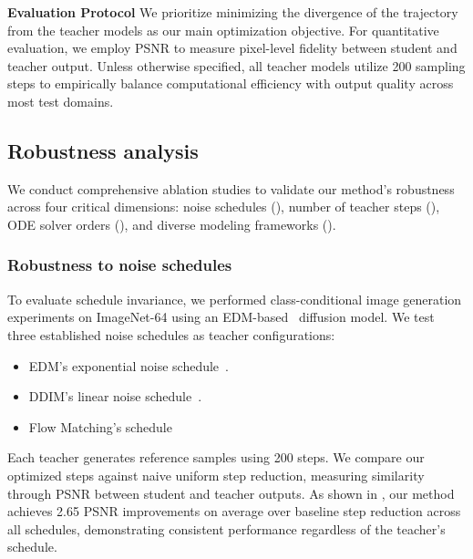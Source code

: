 \documentclass[10pt,twocolumn,letterpaper]{article}
\begin{document}
    \textbf{Evaluation Protocol}
    We prioritize minimizing the divergence of the trajectory from the teacher models as our main optimization objective. For quantitative evaluation, we employ PSNR to measure pixel-level fidelity between student and teacher output. Unless otherwise specified, all teacher models utilize 200 sampling steps to empirically balance computational efficiency with output quality across most test domains.
    
    

    \subsection{Robustness analysis}
    We conduct comprehensive ablation studies to validate our method's robustness across four critical dimensions: noise schedules (), number of teacher steps (), ODE solver orders (), and diverse modeling frameworks ().

    \subsubsection{Robustness to noise schedules} \label{sec:teacher_schedule}
    To evaluate schedule invariance, we performed class-conditional image generation experiments on ImageNet-64\cite{russakovsky2015imagenet} using an EDM-based~\cite{edm} diffusion model. We test three established noise schedules as teacher configurations: 
    \begin{itemize} 
    \item EDM's exponential noise schedule~\cite{edm}. 
    \item DDIM's linear noise schedule~\cite{ddim}. 
    \item Flow Matching's schedule~\cite{lipman2022flow}  
    \end{itemize}
    Each teacher generates reference samples using 200 steps. We compare our optimized steps against naive uniform step reduction, measuring similarity through PSNR between student and teacher outputs. As shown in , our method achieves 2.65 PSNR improvements on average over baseline step reduction across all schedules, demonstrating consistent performance regardless of the teacher's schedule.
\end{document}
